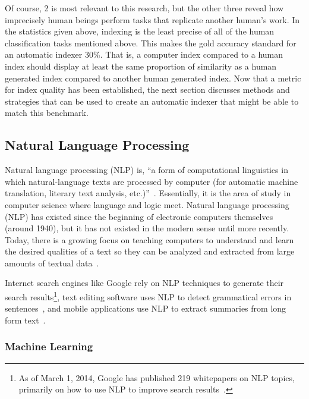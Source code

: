 Of course, 2 is most relevant to this research, but the other three reveal how imprecisely human beings perform tasks that replicate another human's work.
In the statistics given above, indexing is the least precise of all of the human classification tasks mentioned above.
This makes the gold accuracy standard for an automatic indexer 30\%.
That is, a computer index compared to a human index should display at least the same proportion of similarity as a human generated index compared to another human generated index.
Now that a metric for index quality has been established, the next section discusses methods and strategies that can be used to create an automatic indexer that might be able to match this benchmark.

\subsection{Natural Language Processing}

Natural language processing (NLP) is, ``a form of computational linguistics in which natural-language texts are processed by computer (for automatic machine translation, literary text analysis, etc.)''~\cite{oed-nlp}.
Essentially, it is the area of study in computer science where language and logic meet.
Natural language processing (NLP) has existed since the beginning of electronic computers themselves (around 1940), but it has not existed in the modern sense until more recently.
Today, there is a growing focus on teaching computers to understand and learn the desired qualities of a text so they can be analyzed and extracted from large amounts of textual data~\cite{jurafsky}.

Internet search engines like Google rely on NLP techniques to generate their search results\footnote{As of March 1, 2014, Google has published 219 whitepapers on NLP topics, primarily on how to use NLP to improve search results~\cite{google-nlp}.}, text editing software uses NLP to detect grammatical errors in sentences~\cite{norvig}, and mobile applications use NLP to extract summaries from long form text~\cite{bit-of-news}.

\subsubsection{Machine Learning}

